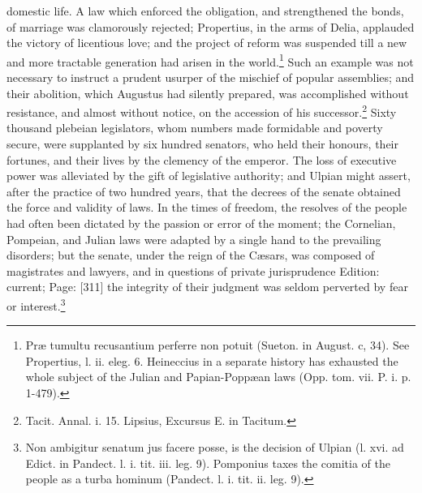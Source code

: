 domestic life. A law which enforced the obligation, and strengthened the bonds, of marriage was clamorously rejected; Propertius, in the arms of Delia, applauded the victory of licentious love; and the project of reform was suspended till a new and more tractable generation had arisen in the world.\footnote{Præ tumultu recusantium perferre non potuit (Sueton. in August. c, 34). See Propertius, l. ii. eleg. 6. Heineccius in a separate history has exhausted the whole subject of the Julian and Papian-Poppæan laws (Opp. tom. vii. P. i. p. 1-479).} Such an example was not necessary to instruct a prudent usurper of the mischief of popular assemblies; and their abolition, which Augustus had silently prepared, was accomplished without resistance, and almost without notice, on the accession of his successor.\footnote{Tacit. Annal. i. 15. Lipsius, Excursus E. in Tacitum.} Sixty thousand plebeian legislators, whom numbers made formidable and poverty secure, were supplanted by six hundred senators, who held their honours, their fortunes, and their lives by the clemency of the emperor. The loss of executive power was alleviated by the gift of legislative authority; and Ulpian might assert, after the practice of two hundred years, that the decrees of the senate obtained the force and validity of laws. In the times of freedom, the resolves of the people had often been dictated by the passion or error of the moment; the Cornelian, Pompeian, and Julian laws were adapted by a single hand to the prevailing disorders; but the senate, under the reign of the Cæsars, was composed of magistrates and lawyers, and in questions of private jurisprudence Edition: current; Page: [311] the integrity of their judgment was seldom perverted by fear or interest.\footnote{Non ambigitur senatum jus facere posse, is the decision of Ulpian (l. xvi. ad Edict. in Pandect. l. i. tit. iii. leg. 9). Pomponius taxes the comitia of the people as a turba hominum (Pandect. l. i. tit. ii. leg. 9).}

